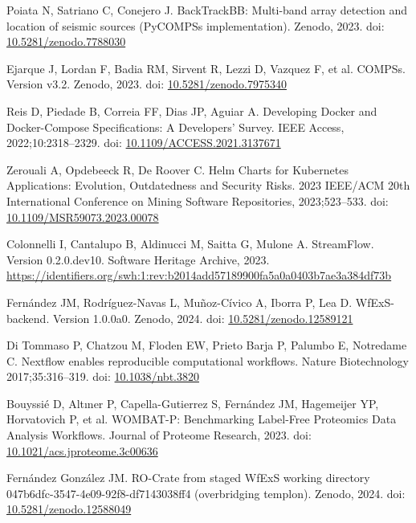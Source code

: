 \documentclass[10pt,letterpaper]{article}
\begin{document}
\begin{thebibliography}{10}
\begin{small}
Poiata N, Satriano C, Conejero J.
BackTrackBB: Multi-band array detection and location of seismic sources (PyCOMPSs implementation).
Zenodo, 2023.
doi: \href{https://doi.org/10.5281/zenodo.7788030}{10.5281/zenodo.7788030}

Ejarque J, Lordan F, Badia RM, Sirvent R, Lezzi D, Vazquez F, et al.
COMPSs. Version v3.2.
Zenodo, 2023.
doi: \href{https://doi.org/10.5281/zenodo.7975340}{10.5281/zenodo.7975340}

Reis D, Piedade B, Correia FF, Dias JP, Aguiar A.
Developing Docker and Docker-Compose Specifications: A Developers’ Survey.
IEEE Access, 2022;10:2318--2329.
doi: \href{https://doi.org/10.1109/ACCESS.2021.3137671}{10.1109/ACCESS.2021.3137671}

Zerouali A, Opdebeeck R, De Roover C.
Helm Charts for Kubernetes Applications: Evolution, Outdatedness and Security Risks.
2023 IEEE/ACM 20th International Conference on Mining Software Repositories, 2023;523--533.
doi: \href{https://doi.org/10.1109/MSR59073.2023.00078}{10.1109/MSR59073.2023.00078}

Colonnelli I, Cantalupo B, Aldinucci M, Saitta G, Mulone A.
StreamFlow. Version 0.2.0.dev10.
Software Heritage Archive, 2023.
\url{https://identifiers.org/swh:1:rev:b2014add57189900fa5a0a0403b7ae3a384df73b}

Fernández JM, Rodríguez-Navas L, Muñoz-Cívico A, Iborra P, Lea D.
WfExS-backend. Version 1.0.0a0.
Zenodo, 2024.
doi: \href{https://doi.org/10.5281/zenodo.12589121}{10.5281/zenodo.12589121}

Di Tommaso P, Chatzou M, Floden EW, Prieto Barja P, Palumbo E, Notredame C.
Nextflow enables reproducible computational workflows.
Nature Biotechnology 2017;35:316–319.
doi: \href{https://doi.org/10.1038/nbt.3820}{10.1038/nbt.3820}

Bouyssié D, Altıner P, Capella-Gutierrez S, Fernández JM, Hagemeijer YP, Horvatovich P, et al.
WOMBAT-P: Benchmarking Label-Free Proteomics Data Analysis Workflows.
Journal of Proteome Research, 2023.
doi: \href{https://doi.org/10.1021/acs.jproteome.3c00636}{10.1021/acs.jproteome.3c00636}

Fernández González JM.
RO-Crate from staged WfExS working directory 047b6dfc-3547-4e09-92f8-df7143038ff4 (overbridging templon).
Zenodo, 2024.
doi: \href{https://doi.org/10.5281/zenodo.12588049}{10.5281/zenodo.12588049}


\end{small}
\end{thebibliography}
\end{document}
